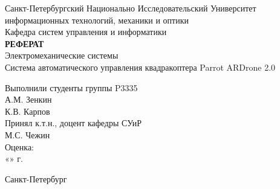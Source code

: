 
	\begin{center}		%

		Санкт-Петербургский Национально Исследовательский Университет\\
		информационных технологий, механики и оптики \\
		Кафедра систем управления и информатики\\[3cm]
		
		\huge \textbf{РЕФЕРАТ}\\[0.5cm]
		\large Электромеханические системы\\[0.1cm]
		\large Система автоматического управления квадракоптера Parrot ARDrone 2.0\\[2cm]

	\end{center}


	\begin{flushright} %

				\large Выполнили студенты группы P3335\\
				\large А.М. Зенкин\\[0.5cm]
				\large К.В. Карпов\\[0.5cm]
				
				\large Принял  к.т.н., доцент кафедры СУиР\\
				\sign[4cm]\large  М.С. Чежин\\
				\large Оценка: \sign\\
				«\underline{\hspace{0.7cm}}» \underline{\hspace{2cm}} \the\year г.

	\end{flushright}
	
	\vfill %

	\begin{center}
	\large Санкт-Петербург\\
	\large \the\year %
	\end{center} %

\thispagestyle{empty} %
\newpage
